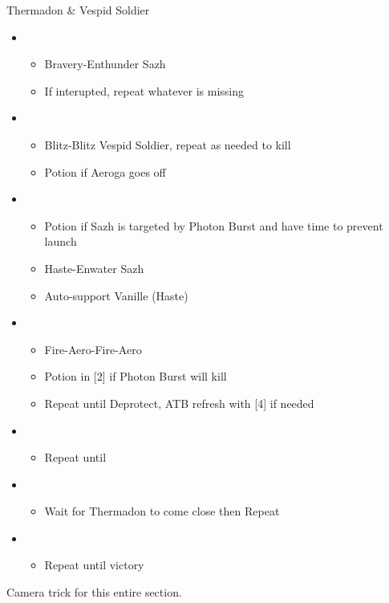 \begin{battle}{Thermadon \& Vespid Soldier}
\begin{itemize}
    \item \first
    \begin{itemize}
        \item Bravery-Enthunder Sazh
        \item If interupted, repeat whatever is missing
    \end{itemize}
    \item \sixth
    \begin{itemize}
        \item Blitz-Blitz Vespid Soldier, repeat as needed to kill
        \item Potion if Aeroga goes off
    \end{itemize}
    \item \first
    \begin{itemize}
        \item Potion if Sazh is targeted by Photon Burst and have time to prevent launch
        \item Haste-Enwater Sazh
        \item Auto-support Vanille (Haste)
    \end{itemize}
    \item \fifth
    \begin{itemize}
        \item Fire-Aero-Fire-Aero
        \item Potion in [2] if Photon Burst will kill
        \item Repeat until Deprotect, ATB refresh with [4] if needed
    \end{itemize}
    \item \fourth
    \begin{itemize}
        \item Repeat until \stagger
    \end{itemize}
    \item \second
    \begin{itemize}
        \item Wait for Thermadon to come close then Repeat
    \end{itemize}
    \item \third
    \begin{itemize}
        \item Repeat until victory
    \end{itemize}
\end{itemize}
\end{battle}
Camera trick for this entire section.

